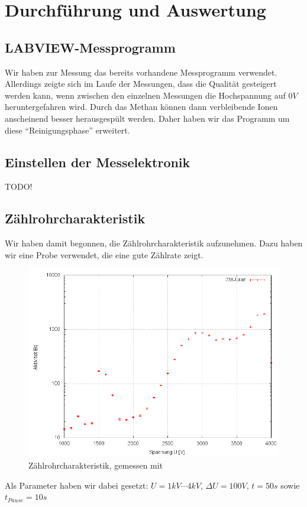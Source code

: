 \section{Durchführung und Auswertung}

\subsection{LABVIEW-Messprogramm}

Wir haben zur Messung das bereits vorhandene Messprogramm verwendet. Allerdings zeigte sich im Laufe der Messungen, dass die Qualität gesteigert werden kann, wenn zwischen den einzelnen Messungen die Hochspannung auf $0V$ heruntergefahren wird. Durch das Methan können dann verbleibende Ionen anscheinend besser herausgespült werden. Daher haben wir das Programm um diese "`Reinigungsphase"' erweitert.

\subsection{Einstellen der Messelektronik}

TODO!

\subsection{Zählrohrcharakteristik}

Wir haben damit begonnen, die Zählrohrcharakteristik aufzunehmen. Dazu haben wir eine  Probe verwendet, die eine gute Zählrate zeigt.

\begin{figure}[H]
 \centering \includegraphics[width=0.9\linewidth]{Messwerte/plots/U238.png}
 \caption{Zählrohrcharakteristik, gemessen mit }
\end{figure}
Als Parameter haben wir dabei gesetzt: $U = 1kV \cdots 4kV$, $\Delta U = 100 V$, $t = 50s$ sowie $t_{Pause} = 10s$

